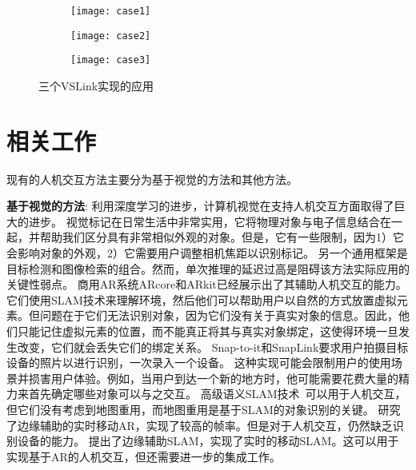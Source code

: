 \begin{figure}[t]
	\centering
	\begin{subfigure}{.65\linewidth}
		\texttt{[image: case1]}
		\caption{}
	\end{subfigure}
	\begin{subfigure}{.65\linewidth}
		\texttt{[image: case2]}
		\caption{}
	\end{subfigure}
	\begin{subfigure}{.65\linewidth}
		\texttt{[image: case3]}
		\caption{}
	\end{subfigure}
	\caption{三个VSLink实现的应用}\label{fig:cases}
\end{figure}


\section{相关工作}\label{sec:related}
现有的人机交互方法主要分为基于视觉的方法和其他方法。

\textbf{基于视觉的方法}: 
利用深度学习的进步，计算机视觉在支持人机交互方面取得了巨大的进步。
视觉标记\cite{wang2010design,olson2011apriltag}在日常生活中非常实用，它将物理对象与电子信息结合在一起，并帮助我们区分具有非常相似外观的对象。但是，它有一些限制，因为1）它会影响对象的外观，2）它需要用户调整相机焦距以识别标记。
另一个通用框架是目标检测\cite{ren2015faster,redmon2018yolov3,qin2019thundernet}和图像检索\cite{philbin2008lost,zheng2017sift}的组合。然而，单次推理的延迟过高是阻碍该方法实际应用的关键性弱点。
商用AR系统ARcore\cite{arcore}和ARkit\cite{arkit}已经展示出了其辅助人机交互的能力。
它们使用SLAM技术来理解环境，然后他们可以帮助用户以自然的方式放置虚拟元素。但问题在于它们无法识别对象，因为它们没有关于真实对象的信息。因此，他们只能记住虚拟元素的位置，而不能真正将其与真实对象绑定，这使得环境一旦发生改变，它们就会丢失它们的绑定关系。
Snap-to-it\cite{de2016snap}和SnapLink\cite{chen2018snaplink}要求用户拍摄目标设备的照片以进行识别，一次录入一个设备。
这种实现可能会限制用户的使用场景并损害用户体验。例如，当用户到达一个新的地方时，他可能需要花费大量的精力来首先确定哪些对象可以与之交互。
高级语义SLAM技术~\cite{strecke2019fusion,runz2018maskfusion,salas2013slam++}可以用于人机交互，但它们没有考虑到地图重用，而地图重用是基于SLAM的对象识别的关键。
\cite{liu2019edge}研究了边缘辅助的实时移动AR，实现了较高的帧率。但是对于人机交互，\cite{liu2019edge}仍然缺乏识别设备的能力。
\cite{ben2020edge,xu2020edge,liu2021edgesharing}提出了边缘辅助SLAM，实现了实时的移动SLAM。这可以用于实现基于AR的人机交互，但还需要进一步的集成工作。

